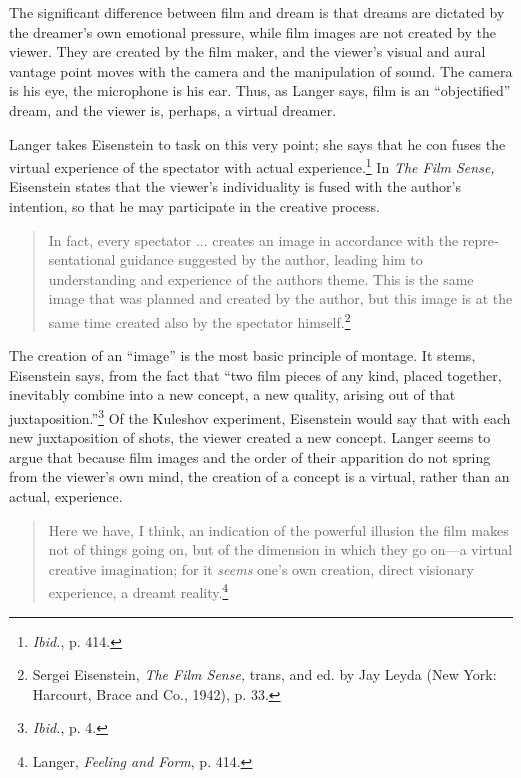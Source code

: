 \documentclass{tufte-handout}
\begin{document}
The significant difference between film and dream is that dreams are
dictated by the dreamer's own emotional pressure, while film images are
not created by the viewer. They are created by the film maker, and the
viewer's visual and aural vantage point moves with the camera and the
manipulation of sound. The camera is his eye, the microphone is his ear.
Thus, as Langer says, film is an ``objectified'' dream, and the viewer
is, perhaps, a virtual dreamer.

Langer takes Eisenstein to task on this very point; she says that he con­
fuses the virtual experience of the spectator with actual
experience.\footnote{\emph{Ibid.}, p. 414.} In \emph{The Film Sense,}
Eisenstein states that the viewer's individuality is fused with the
author's intention, so that he may participate in the creative pro­cess.

\begin{quote}
In fact, every spectator ... creates an image in accordance with the
repre­sentational guidance suggested by the author, leading him to
understanding and experience of the author\textquotesingle s theme. This
is the same image that was plan­ned and created by the author, but this
image is at the same time created also by the spectator
himself.\footnote{Sergei Eisenstein, \emph{The Film Sense,} trans, and
  ed. by Jay Leyda (New York: Harcourt, Brace and Co., 1942), p. 33.}
\end{quote}

\noindent The creation of an ``image'' is the most basic principle of montage. It
stems, Eisenstein says, from the fact that ``two film pieces of any
kind, placed to­gether, inevitably combine into a new concept, a new
quality, arising out of that juxtaposition.''\footnote{\emph{Ibid.}, p.
  4.} Of the Kuleshov experiment, Eisenstein would say that with each
new juxtaposition of shots, the viewer created a new con­cept. Langer
seems to argue that because film images and the order of their
apparition do not spring from the viewer's own mind, the creation of a
concept is a virtual, rather than an actual, experience.

\begin{quote}
Here we have, I think, an indication of the powerful illusion the film
makes not of things going on, but of the dimension in which they go
on---a virtual creative imagination; for it \emph{seems} one's own
creation, direct visionary experi­ence, a dreamt reality.\footnote{Langer,
  \emph{Feeling and Form}, p. 414.}
\end{quote}
\end{document}
